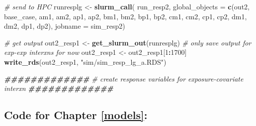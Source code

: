 \documentclass[12pt, twoside]{amherstthesis}
\newenvironment{Shaded}{\begin{snugshade}}{\end{snugshade}}
\newcommand{\AttributeTok}[1]{\textcolor[rgb]{0.13,0.29,0.53}{#1}}
\newcommand{\CommentTok}[1]{\textcolor[rgb]{0.56,0.35,0.01}{\textit{#1}}}
\newcommand{\DecValTok}[1]{\textcolor[rgb]{0.00,0.00,0.81}{#1}}
\newcommand{\DocumentationTok}[1]{\textcolor[rgb]{0.56,0.35,0.01}{\textbf{\textit{#1}}}}
\newcommand{\FunctionTok}[1]{\textcolor[rgb]{0.13,0.29,0.53}{\textbf{#1}}}
\newcommand{\NormalTok}[1]{#1}
\newcommand{\OtherTok}[1]{\textcolor[rgb]{0.56,0.35,0.01}{#1}}
\newcommand{\SpecialCharTok}[1]{\textcolor[rgb]{0.81,0.36,0.00}{\textbf{#1}}}
\newcommand{\StringTok}[1]{\textcolor[rgb]{0.31,0.60,0.02}{#1}}
\begin{document}
\begin{Shaded}
\begin{Highlighting}[]
\CommentTok{\# send to HPC}
\NormalTok{runresplg }\OtherTok{\textless{}{-}} \FunctionTok{slurm\_call}\NormalTok{(}
\NormalTok{  run\_resp2, }
  \AttributeTok{global\_objects =} \FunctionTok{c}\NormalTok{(}\StringTok{\textquotesingle{}out2\textquotesingle{}}\NormalTok{, }\StringTok{\textquotesingle{}base\_case\textquotesingle{}}\NormalTok{, }
                     \StringTok{\textquotesingle{}am1\textquotesingle{}}\NormalTok{, }\StringTok{\textquotesingle{}am2\textquotesingle{}}\NormalTok{, }\StringTok{\textquotesingle{}ap1\textquotesingle{}}\NormalTok{, }\StringTok{\textquotesingle{}ap2\textquotesingle{}}\NormalTok{, }
                     \StringTok{\textquotesingle{}bm1\textquotesingle{}}\NormalTok{, }\StringTok{\textquotesingle{}bm2\textquotesingle{}}\NormalTok{, }\StringTok{\textquotesingle{}bp1\textquotesingle{}}\NormalTok{, }\StringTok{\textquotesingle{}bp2\textquotesingle{}}\NormalTok{, }
                     \StringTok{\textquotesingle{}cm1\textquotesingle{}}\NormalTok{, }\StringTok{\textquotesingle{}cm2\textquotesingle{}}\NormalTok{, }\StringTok{\textquotesingle{}cp1\textquotesingle{}}\NormalTok{, }\StringTok{\textquotesingle{}cp2\textquotesingle{}}\NormalTok{, }
                     \StringTok{\textquotesingle{}dm1\textquotesingle{}}\NormalTok{, }\StringTok{\textquotesingle{}dm2\textquotesingle{}}\NormalTok{, }\StringTok{\textquotesingle{}dp1\textquotesingle{}}\NormalTok{, }\StringTok{\textquotesingle{}dp2\textquotesingle{}}\NormalTok{),}
  \AttributeTok{jobname =} \StringTok{\textquotesingle{}sim\_resp2\textquotesingle{}}\NormalTok{)}

\CommentTok{\# get output}
\NormalTok{out2\_resp1 }\OtherTok{\textless{}{-}} \FunctionTok{get\_slurm\_out}\NormalTok{(runresplg)}
\CommentTok{\# only save output for exp{-}exp interxns for now}
\NormalTok{out2\_resp1 }\OtherTok{\textless{}{-}}\NormalTok{ out2\_resp1[}\DecValTok{1}\SpecialCharTok{:}\DecValTok{1700}\NormalTok{]}
\FunctionTok{write\_rds}\NormalTok{(out2\_resp1, }\StringTok{"sim/sim\_resp\_lg\_a.RDS"}\NormalTok{)}
\end{Highlighting}
\end{Shaded}
\begin{Shaded}
\begin{Highlighting}[]
\DocumentationTok{\#\#\#\#\#\#\#\#\#\#\#\#\#}
\CommentTok{\# create response variables for exposure{-}covariate interxn}
\DocumentationTok{\#\#\#\#\#\#\#\#\#\#\#\#\#}
\end{Highlighting}
\end{Shaded}
\hypertarget{code-for-chapter-refmodels}{%
\subsection{Code for Chapter \ref{models}:}\label{code-for-chapter-refmodels}}
\end{document}
